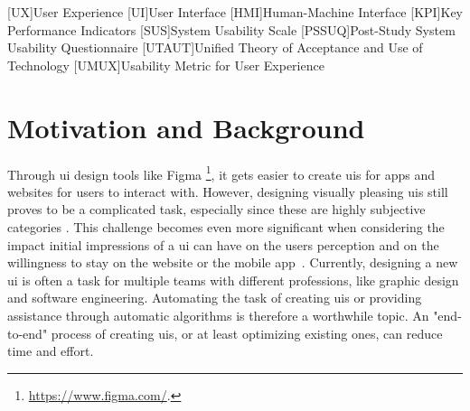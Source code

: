 \documentclass[10pt,a4paper]{scrartcl} %
\begin{document}
\pagestyle{plain}
\title{\rmfamily\normalfont{}}
\subtitle{\rmfamily{}}
\author{}

\maketitle
\begin{acronym}
    [UX]{User Experience}
    [UI]{User Interface}
    [HMI]{Human-Machine Interface}
    [KPI]{Key Performance Indicators}
    [SUS]{System Usability Scale}
    [PSSUQ]{Post-Study System Usability Questionnaire}
    [UTAUT]{Unified Theory of Acceptance and Use of Technology}
    [UMUX]{Usability Metric for User Experience}
\end{acronym}

\section{Motivation and Background}
Through \ac{ui} design tools like Figma \footnote{\url{https://www.figma.com/}.}, it gets easier to create \acp{ui} for apps and websites for users to interact with. However, designing visually pleasing \acp{ui} still  proves to be a complicated task, especially since these are highly subjective categories \cite{vonwangenheim2018agree}.
This challenge becomes even more significant when considering the impact initial impressions of a \ac{ui} can have on the users perception and on the willingness to stay on the website or the mobile app~\cite{effects_of_website_designs}. Currently, designing a 
new \ac{ui} is often a task for multiple teams with different professions, 
like graphic design and software engineering. 
 Automating the task of creating \acp{ui} or providing assistance through automatic algorithms is therefore a worthwhile topic. An "end-to-end" process of creating \acp{ui}, or at least optimizing existing ones, can reduce time and effort.
\end{document}
